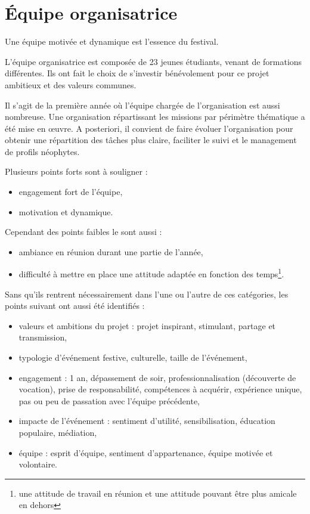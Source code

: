 \documentclass[12pt,a4paper]{report}
\begin{document}
\chapter{Équipe organisatrice}

Une équipe motivée et dynamique est l'essence du festival. 

L’équipe organisatrice est composée de 23 jeunes étudiants, venant de formations différentes. Ils ont fait le choix de s’investir bénévolement pour ce projet ambitieux et des valeurs communes.

Il s'agit de la première année où l'équipe chargée de l'organisation est aussi nombreuse. Une organisation répartissant les missions par périmètre thématique a été mise en œuvre. A posteriori, il convient de faire évoluer l'organisation pour obtenir une répartition des tâches plus claire, faciliter le suivi et le management de profils néophytes. 

Plusieurs points forts sont à souligner : 
\begin{itemize}
\item engagement fort de l'équipe,
\item motivation et dynamique.
\end{itemize}

Cependant des points faibles le sont aussi : 
\begin{itemize}
\item ambiance en réunion durant une partie de l'année,
\item difficulté à mettre en place une attitude adaptée en fonction des temps\footnote{une attitude de travail en réunion et une attitude pouvant être plus amicale en dehors}.
\end{itemize}

Sans qu'ils rentrent nécessairement dans l'une ou  l'autre de ces catégories, les points suivant ont aussi été identifiés :
\begin{itemize}
\item valeurs et ambitions du projet : projet inspirant, stimulant, partage et transmission,
\item typologie d'événement festive, culturelle, taille de l'événement,
\item engagement : 1 an, dépassement de soir, professionnalisation (découverte de vocation), prise de responsabilité, compétences à acquérir, expérience unique, pas ou peu de passation avec l'équipe précédente,
\item impacte de l'événement : sentiment d'utilité, sensibilisation, éducation populaire, médiation,
\item équipe : esprit d'équipe, sentiment d'appartenance, équipe motivée et volontaire.
\end{itemize}
\end{document}
